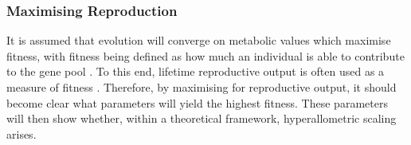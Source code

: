 \documentclass[a4paper, 11pt, hidelinks]{article} %
\begin{document}
	\subsubsection{Maximising Reproduction}
	It is assumed that evolution will converge on metabolic values which maximise fitness, with fitness being defined as how much an individual is able to contribute to the gene pool \parencite{Speakman2008, Stearns2000}.  %
	To this end, lifetime reproductive output is often used as a measure of fitness \parencite{Charnov1991, Audzijonyte2018, Speakman2008, Stearns2000, Charnov2001, Tsoukali2016, Brown1993, Charnov2007}.  Therefore, by maximising for reproductive output, it should become clear what parameters will yield the highest fitness.  These parameters will then show whether, within a theoretical framework, hyperallometric scaling arises.
	
\end{document}
